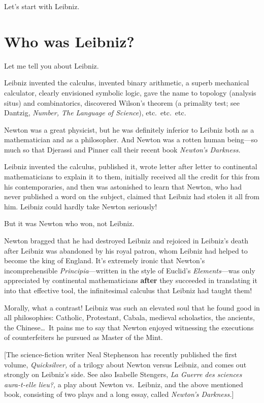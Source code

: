 \documentclass[12pt]{book}
\begin{document}
Let's start with Leibniz.

\section*{Who was Leibniz?}

Let me tell you about Leibniz.
 
Leibniz invented the calculus, invented binary arithmetic, a superb mechanical
calculator, clearly envisioned symbolic logic, gave the name to topology
(analysis situs) and combinatorics, discovered Wilson's theorem (a primality test; see 
Dantzig, \emph{Number, The Language of Science}),
etc.\ etc.\ etc.
 
Newton was a great physicist, but he was definitely inferior to Leibniz both as a mathematician
and as a philosopher. And Newton was a rotten human being---so much so that 
Djerassi and Pinner call their recent book \emph{Newton's Darkness.} 
 
Leibniz invented the calculus, published it, wrote letter after letter to
continental mathematicians to explain it to them, initially received all the credit for this
from his contemporaries, and then was astonished to learn that Newton, who had
never published a word on the subject, claimed that Leibniz had stolen it all from
him. Leibniz could hardly take Newton seriously!
 
But it was Newton who won, not Leibniz.
 
Newton bragged that he had destroyed Leibniz
and rejoiced in Leibniz's death after Leibniz was abandoned by his royal patron,
whom Leibniz had helped to become the king of England. 
It's extremely ironic that Newton's incomprehensible \emph{Principia}---written
in the style of Euclid's \emph{Elements}---was only appreciated
by continental mathematicians \textbf{after} they succeeded in translating
it into that effective tool, the infinitesimal calculus that Leibniz had taught them!
 
Morally, what a contrast!
Leibniz was such an elevated soul that he found good in
all philosophies: Catholic, Protestant, Cabala, medieval scholastics, the ancients,
the Chinese\ldots\ It pains me to say that Newton enjoyed witnessing the executions
of counterfeiters he pursued as Master of the Mint.
 
\medskip
{\footnotesize [The science-fiction writer Neal Stephenson has recently published the first 
volume, \emph{Quicksilver,} 
of a trilogy about Newton versus Leibniz, and comes out strongly
on Leibniz's side.
See also Isabelle Stengers, \emph{La Guerre des sciences aura-t-elle lieu?,} a
play about Newton vs.\ Leibniz, and the above mentioned book, consisting
of two plays and a long essay, called \emph{Newton's Darkness.}]

}
\medskip
\end{document}
